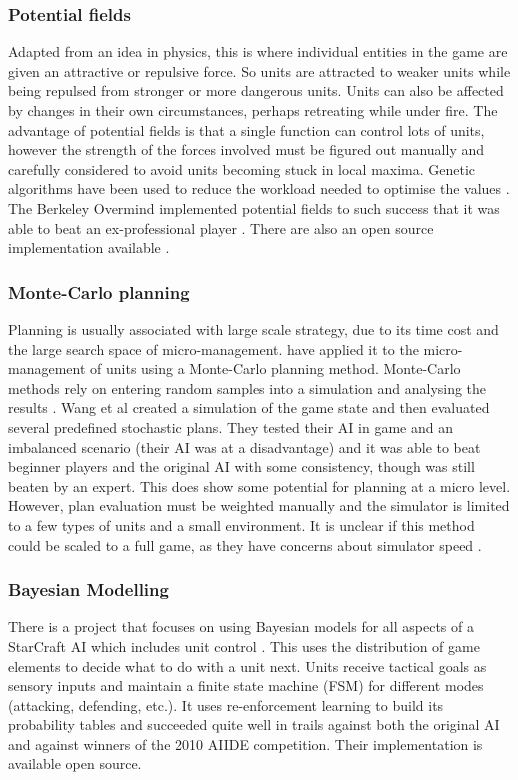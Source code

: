 \documentclass[11pt,openright,a4paper]{report}
\begin{document}
\subsubsection{Potential fields}
Adapted from an idea in physics, this is where individual entities in the game are given an attractive or repulsive force. So units are attracted to weaker units while being repulsed from stronger or more dangerous units. Units can also be affected by changes in their own circumstances, perhaps retreating while under fire. The advantage of potential fields is that a single function can control lots of units, however the strength of the forces involved must be figured out manually and carefully considered to avoid units becoming stuck in local maxima. Genetic algorithms have been used to reduce the workload needed to optimise the values \cite{rathe2012micromanagement}. The Berkeley Overmind \cite{BerkeleyOvermind} implemented potential fields to such success that it was able to beat an ex-professional player \cite{OvermindArticle}. There are also an open source implementation available \cite{AIBot}.

\subsubsection{Monte-Carlo planning}
Planning is usually associated with large scale strategy, due to its time cost and the large search space of micro-management.  have applied it to the micro-management of units using a Monte-Carlo planning method. Monte-Carlo methods rely on entering random samples into a simulation and analysing the results \cite{MonteCarlo}. Wang et al created a simulation of the game state and then evaluated several predefined stochastic plans. They tested their AI in game and an imbalanced scenario (their AI was at a disadvantage) and it was able to beat beginner players and the original AI with some consistency, though was still beaten by an expert. This does show some potential for planning at a micro level. However, plan evaluation must be weighted manually and the simulator is limited to a few types of units and a small environment. It is unclear if this method could be scaled to a full game, as they have concerns about simulator speed .

\subsubsection{Bayesian Modelling}
There is a project that focuses on using Bayesian models for all aspects of a StarCraft AI \cite{synnaeve2012bayesian} which includes unit control \cite{synnaeve2011bayesian}. This uses the distribution of game elements to decide what to do with a unit next. Units receive tactical goals as sensory inputs and maintain a finite state machine (FSM) for different modes (attacking, defending, etc.). It uses re-enforcement learning to build its probability tables and succeeded quite well in trails against both the original AI and against winners of the 2010 AIIDE competition. Their implementation is available open source.
\end{document}
